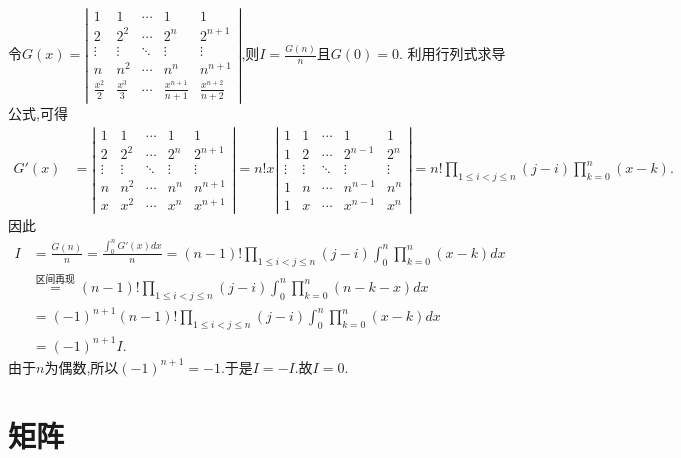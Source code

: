 \documentclass[lang=cn,newtx,10pt,scheme=chinese]{elegantbook}
\begin{document}
\begin{solution}
令\(G(x)=\left|\begin{matrix}
1 & 1 & \cdots & 1 & 1\\
2 & 2^2 & \cdots & 2^n & 2^{n + 1}\\
\vdots & \vdots & \ddots & \vdots & \vdots\\
n & n^2 & \cdots & n^n & n^{n + 1}\\
\frac{x^2}{2} & \frac{x^3}{3} & \cdots & \frac{x^{n + 1}}{n + 1} & \frac{x^{n + 2}}{n + 2}
\end{matrix}\right|\),则\(I = \frac{G(n)}{n}\)且\(G(0) = 0\).      
利用行列式求导公式,可得
\begin{align*}
G'(x)&=\left|\begin{matrix}
1 & 1 & \cdots & 1 & 1\\
2 & 2^2 & \cdots & 2^n & 2^{n + 1}\\
\vdots & \vdots & \ddots & \vdots & \vdots\\
n & n^2 & \cdots & n^n & n^{n + 1}\\
x & x^2 & \cdots & x^n & x^{n + 1}
\end{matrix}\right|
= n!x\left|\begin{matrix}
1 & 1 & \cdots & 1 & 1\\
1 & 2 & \cdots & 2^{n - 1} & 2^n\\
\vdots & \vdots & \ddots & \vdots & \vdots\\
1 & n & \cdots & n^{n - 1} & n^n\\
1 & x & \cdots & x^{n - 1} & x^n
\end{matrix}\right|
= n!\prod_{1\leqslant i < j\leqslant n}(j - i)\prod_{k = 0}^{n}(x - k).
\end{align*}
因此
\begin{align*}
I &= \frac{G(n)}{n}=\frac{\int_{0}^{n}G'(x)dx}{n}=(n - 1)!\prod_{1\leqslant i < j\leqslant n}(j - i)\int_{0}^{n}\prod_{k = 0}^{n}(x - k)dx
\\
&\stackrel{\text{区间再现}}{=}(n - 1)!\prod_{1\leqslant i < j\leqslant n}(j - i)\int_{0}^{n}\prod_{k = 0}^{n}(n - k - x)dx
\\
&= (-1)^{n + 1}(n - 1)!\prod_{1\leqslant i < j\leqslant n}(j - i)\int_{0}^{n}\prod_{k = 0}^{n}(x - k)dx
\\
&= (-1)^{n + 1}I.
\end{align*}      
由于\(n\)为偶数,所以\((-1)^{n + 1} = -1\).于是\(I = -I\).故\(I = 0\). 
\end{solution}

\chapter{矩阵}
\end{document}
